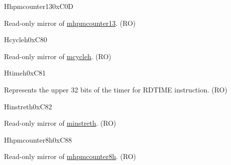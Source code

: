 \begin{register}{H}{hpmcounter13}{0xC0D}\label{regdesc:HPMCOUNTER13}
%
\regnewline%
\begin{regdesc}\begin{reglist}
\label{fielddesc:HPMCOUNTER13}\item [HPMCOUNTER13] Read-only mirror of \hyperref[regdesc:MHPMCOUNTER13]{mhpmcounter13}. (RO)
\end{reglist}\end{regdesc}
\end{register}


\begin{register}{H}{cycleh}{0xC80}\label{regdesc:CYCLEH}
%
\regnewline%
\begin{regdesc}\begin{reglist}
\label{fielddesc:CYCLEH}\item [CYCLEH] Read-only mirror of \hyperref[regdesc:MCYCLEH]{mcycleh}. (RO)
\end{reglist}\end{regdesc}
\end{register}

\begin{register}{H}{timeh}{0xC81}\label{regdesc:TIMEH}
%
\regnewline%
\begin{regdesc}\begin{reglist}
\label{fielddesc:TIMEH}\item [TIMEH] Represents the upper 32 bits of the timer for RDTIME instruction. (RO)
\end{reglist}\end{regdesc}
\end{register}

\begin{register}{H}{instreth}{0xC82}\label{regdesc:INSTRETH}
%
\regnewline%
\begin{regdesc}\begin{reglist}
\label{fielddesc:INSTRETH}\item [INSTRETH] Read-only mirror of \hyperref[regdesc:MINSTRETH]{minstreth}. (RO)
\end{reglist}\end{regdesc}
\end{register}

\begin{register}{H}{hpmcounter8h}{0xC88}\label{regdesc:HPMCOUNTER8H}
%
\regnewline%
\begin{regdesc}\begin{reglist}
\label{fielddesc:HPMCOUNTER8H}\item [HPMCOUNTER8H] Read-only mirror of \hyperref[regdesc:MHPMCOUNTER8H]{mhpmcounter8h}. (RO)
\end{reglist}\end{regdesc}
\end{register}

